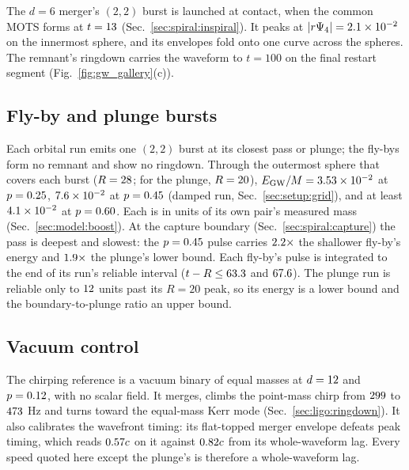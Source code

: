 \documentclass[twocolumn,floatfix,aps,prd,superscriptaddress,nofootinbib]{revtex4-2}
\begin{document}
The $d=6$ merger's $(2,2)$ burst is launched at contact, when the common MOTS forms at $t=13$ (Sec.~\ref{sec:spiral:inspiral}). It peaks at $|r\Psi_4|=2.1\times10^{-2}$ on the innermost sphere, and its envelopes fold onto one curve across the spheres. The remnant's ringdown carries the waveform to $t=100$ on the final restart segment (Fig.~\ref{fig:gw_gallery}(c)).

\subsection{Fly-by and plunge bursts}
\label{sec:gw:flyby}

Each orbital run emits one $(2,2)$ burst at its closest pass or plunge; the fly-bys form no remnant and show no ringdown. Through the outermost sphere that covers each burst ($R=28$; for the plunge, $R=20$), $E_{\rm GW}/M=3.53\times10^{-2}$ at $p=0.25$, $7.6\times10^{-2}$ at $p=0.45$ (damped run, Sec.~\ref{sec:setup:grid}), and at least $4.1\times10^{-2}$ at $p=0.60$. Each is in units of its own pair's measured mass (Sec.~\ref{sec:model:boost}). At the capture boundary (Sec.~\ref{sec:spiral:capture}) the pass is deepest and slowest: the $p=0.45$ pulse carries $2.2\times$ the shallower fly-by's energy and $1.9\times$ the plunge's lower bound. Each fly-by's pulse is integrated to the end of its run's reliable interval ($t-R\le63.3$ and $67.6$). The plunge run is reliable only to $12$ units past its $R=20$ peak, so its energy is a lower bound and the boundary-to-plunge ratio an upper bound.

\subsection{Vacuum control}
\label{sec:controls:bbh}

The chirping reference is a vacuum binary of equal masses at $d=12$ and $p=0.12$, with no scalar field. It merges, climbs the point-mass chirp from $299$ to $473$ Hz and turns toward the equal-mass Kerr mode (Sec.~\ref{sec:ligo:ringdown}). It also calibrates the wavefront timing: its flat-topped merger envelope defeats peak timing, which reads $0.57{}c$ on it against $0.82{}c$ from its whole-waveform lag. Every speed quoted here except the plunge's is therefore a whole-waveform lag.
\end{document}
